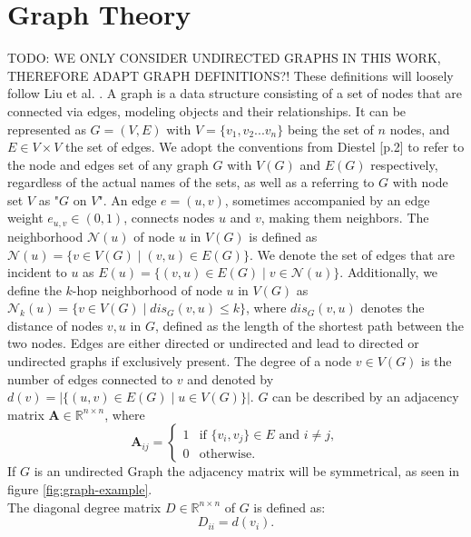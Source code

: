 \section{Graph Theory}
\label{sec:graph_theory}
TODO: WE ONLY CONSIDER UNDIRECTED GRAPHS IN THIS WORK, THEREFORE ADAPT GRAPH DEFINITIONS?!
These definitions will loosely follow Liu et al. \cite{Liu2020}. A graph is a data structure consisting of a set of nodes that are connected via edges, modeling objects and their relationships. It can be represented as $G=(V,E)$ with $V=\{v_1,v_2...v_n\}$ being the set of $n$ nodes, and $E \in V \times V$ the set of edges. We adopt the conventions from Diestel \cite{Diestel2017}[p.2] to refer to the node and edges set of any graph $G$ with $V(G)$ and $E(G)$ respectively, regardless of the actual names of the sets, as well as a referring to $G$ with node set $V$ as "$G$ on $V$". An edge $e=(u,v)$, sometimes accompanied by an edge weight $e_{u,v}\in (0,1)$, connects nodes $u$ and $v$, making them neighbors. The neighborhood $\mathcal{N}(u)$ of node $u$ in $V(G)$ is defined as $\mathcal{N}(u) = \{v \in V(G) \mid (v,u) \in E(G)\}$. We denote the set of edges that are incident to $u$ as $E(u) = \{(v,u) \in E(G) \mid v \in \mathcal{N}(u)\}$. Additionally, we define the $k$-hop neighborhood of node $u$ in $V(G)$ as $\mathcal{N}_k(u) = \{v \in V(G) \mid dis_G(v,u) \leq k\}$, where $dis_G(v,u)$ denotes the distance of nodes $v, u$ in $G$, defined as the length of the shortest path between the two nodes. Edges are either directed or undirected and lead to directed or undirected graphs if exclusively present. The degree of a node $v \in V(G)$ is the number of edges connected to $v$ and denoted by $d(v) = |\{(u,v) \in E(G) \mid u \in V(G)\}|$. $G$ can be described by an adjacency matrix $\mathbf{A} \in \mathbb{R}^{n \times n}$, where
\begin{equation*}
    \mathbf{A}_{ij}=\begin{cases}
        1 & \text{if } \{v_i,v_j\}\in E \text{ and } i \neq j, \\
        0 & \text{otherwise.}
    \end{cases}
\end{equation*}
If $G$ is an undirected Graph the adjacency matrix will be symmetrical, as seen in figure \ref{fig:graph-example}. \\
The diagonal degree matrix $D\in \mathbb{R}^{n\times n}$ of $G$ is defined as:
\begin{equation*}
    D_{ii} = d(v_i).
\end{equation*}

